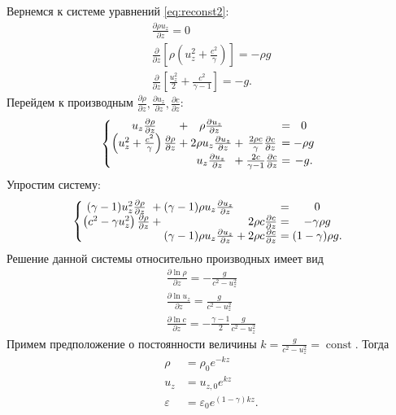 \documentclass[12pt]{article}
\newcommand{\pd}[2]{\frac{\partial #1}{\partial #2}}
\begin{document}
Вернемся к системе уравнений \eqref{eq:reconst2}:
\begin{equation}
\begin{gathered}
\pd{\rho u_z}{z} = 0\\
\pd{}{z}\left[\rho \left(u_z^2 + \frac{c^2}{\gamma}\right)\right] = -\rho g\\
\pd{}{z}\left[\frac{u_z^2}{2} + \frac{c^2}{\gamma-1}\right] = -g.
\end{gathered}
\label{eq:reconst3}
\end{equation}
Перейдем к производным $\pd{\rho}{z}, \pd{u_z}{z}, \pd{c}{z}$:
\begin{equation}
\left\{
\begin{array}{@{}c@{}c@{}c@{}c@{}c@{}c@{}c}
u_z\pd{\rho}{z} &{}+{}&\rho \pd{u_z}{z} &&&{}={}& 0\\
\left(u_z^2 + \frac{c^2}{\gamma}\right)\pd{\rho}{z} &{}+{}&
2\rho u_z \pd{u_z}{z} &{}+{}&
\frac{2\rho c}{\gamma} \pd{c}{z} &{}={}& -\rho g\\
&&u_z \pd{u_z}{z} &{}+{}&\frac{2c}{\gamma- 1} \pd{c}{z}&{}={}& -g.
\end{array}
\right.
\label{eq:reconst4}
\end{equation}
Упростим систему:
\begin{equation}
\left\{
\begin{array}{@{}c@{}c@{}c@{}c@{}c@{}c@{}c}
(\gamma - 1)u_z^2\pd{\rho}{z} &{}+{}&(\gamma - 1)\rho u_z\pd{u_z}{z} &&&{}={}& 0\\
\left(c^2-\gamma u_z^2\right)\pd{\rho}{z} &{}+{}&
&&
{2\rho c}\pd{c}{z} &{}={}& -\gamma\rho g\\
&&(\gamma-1)\rho u_z \pd{u_z}{z} &{}+{}&{2\rho c} \pd{c}{z}&{}={}& (1 - \gamma)\rho 
g.
\end{array}
\right.
\label{eq:reconst5}
\end{equation}
Решение данной системы относительно производных имеет вид
\begin{equation}
\begin{gathered}
\pd{\ln \rho}{z} = -\frac{g}{c^2 - u_z^2}\\
\pd{\ln u_z}{z} = \frac{g}{c^2 - u_z^2}\\
\pd{\ln c}{z} = -\frac{\gamma-1}{2}\frac{g}{c^2 - u_z^2}
\label{eq:sol}
\end{gathered}
\end{equation}
Примем предположение о постоянности величины $k = \frac{g}{c^2 - u_z^2} = \operatorname{const}$. 
Тогда
\begin{equation}
\begin{aligned}
\rho &{}= \rho_0 e^{-kz}\\
u_z &{}= u_{z,0} e^{kz}\\
\varepsilon &{}= \varepsilon_0 e^{(1-\gamma)kz}.
\label{eq:sol2}
\end{aligned}
\end{equation}
\end{document}
